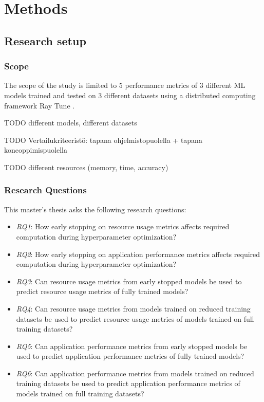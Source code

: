 \chapter{Methods}
\label{chap:methods}

\section{Research setup}
\subsection{Scope}
The scope of the study is limited to 5 performance metrics of 3 different ML models trained and tested on 3 different datasets using a distributed computing framework Ray Tune \parencite{liawTuneResearchPlatform2018}.

TODO different models, different datasets

TODO Vertailukriteeristö: tapana ohjelmistopuolella + tapana koneoppimispuolella

TODO different resources (memory, time, accuracy)



\subsection{Research Questions}
This master's thesis asks the following research questions:
\begin{itemize}
    \item \emph{RQ1}: How early stopping on resource usage metrics affects required computation during hyperparameter optimization?
    \item \emph{RQ2}: How early stopping on application performance metrics affects required computation during hyperparameter optimization?
    \item \emph{RQ3}: Can resource usage metrics from early stopped models be used to predict resource usage metrics of fully trained models?
    \item \emph{RQ4}: Can resource usage metrics from models trained on reduced training datasets be used to predict resource usage metrics of models trained on full training datasets?
    \item \emph{RQ5}: Can application performance metrics from early stopped models be used to predict application performance metrics of fully trained models?
    \item \emph{RQ6}: Can application performance metrics from models trained on reduced training datasets be used to predict application performance metrics of models trained on full training datasets?
\end{itemize}

